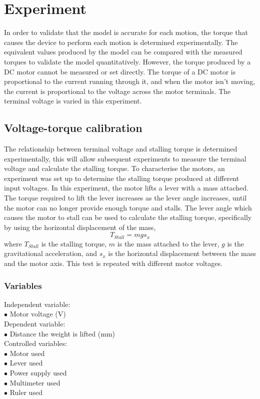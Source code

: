 \chapter{Experiment}

In order to validate that the model is accurate for each motion, the torque that causes the device to perform each motion is determined experimentally. The equivalent values produced by the model can be compared with the measured torques to validate the model quantitatively. However, the torque produced by a DC motor cannot be measured or set directly. The torque of a DC motor is proportional to the current running through it, and when the motor isn't moving, the current is proportional to the voltage across the motor terminals. The terminal voltage is varied in this experiment.

\section{Voltage-torque calibration} \label{sec:Voltage-torque calibration}
The relationship between terminal voltage and stalling torque is determined experimentally, this will allow subsequent experiments to measure the terminal voltage and calculate the stalling torque.
To characterise the motors, an experiment was set up to determine the stalling torque produced at different input voltages. In this experiment, the motor lifts a lever with a mass attached. The torque required to lift the lever increases as the lever angle increases, until the motor can no longer provide enough torque and stalls. The lever angle which causes the motor to stall can be used to calculate the stalling torque, specifically by using the horizontal displacement of the mass,
\begin{equation}
	T_{Stall} = m g s_x
\end{equation}
where $T_{Stall}$ is the stalling torque, $m$ is the mass attached to the lever, $g$ is the gravitational acceleration, and $s_x$ is the horizontal displacement between the mass and the motor axis.
This test is repeated with different motor voltages.\\

\subsection{Variables}
Independent variable:\\
$\bullet$ Motor voltage (V)\\
Dependent variable:\\
$\bullet$ Distance the weight is lifted (mm)\\
Controlled variables:\\
$\bullet$ Motor used\\
$\bullet$ Lever used\\
$\bullet$ Power supply used\\
$\bullet$ Multimeter used\\
$\bullet$ Ruler used\\

